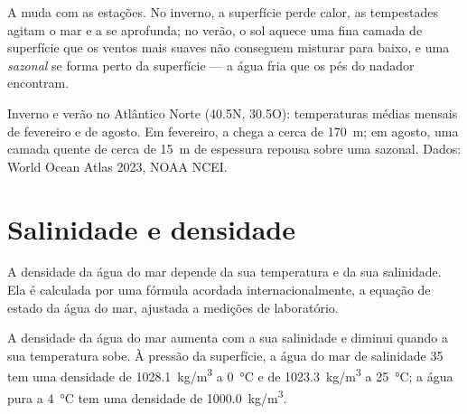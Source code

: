 A  muda com as estações. No inverno, a superfície perde
calor, as tempestades agitam o mar e a  se aprofunda; no
verão, o sol aquece uma fina camada de superfície que os ventos mais suaves
não conseguem misturar para baixo, e uma \emph{ sazonal} se forma
perto da superfície --- a água fria que os pés do nadador encontram.

\begin{omfigure}

{\small Inverno e verão no Atlântico Norte (40.5\textdegree N,
30.5\textdegree O): temperaturas médias mensais de fevereiro e de agosto.
Em fevereiro, a  chega a cerca de \qty{170}{m}; em agosto,
uma camada quente de cerca de \qty{15}{m} de espessura repousa sobre uma
 sazonal. Dados: World Ocean Atlas 2023, NOAA NCEI.}
\end{omfigure}

\section{Salinidade e densidade}

A densidade da água do mar depende da sua temperatura e da sua salinidade.
Ela é calculada por uma fórmula acordada internacionalmente, a equação de
estado da água do mar, ajustada a medições de laboratório.

\begin{proposition}\label{prop:g10:layered-ocean:density}
A densidade da água do mar aumenta com a sua salinidade e diminui quando a
sua temperatura sobe. À pressão da superfície, a água do mar de salinidade
35 tem uma densidade de \qty{1028.1}{kg/m^3} a \qty{0}{\degreeCelsius} e de
\qty{1023.3}{kg/m^3} a \qty{25}{\degreeCelsius}; a água pura a
\qty{4}{\degreeCelsius} tem uma densidade de \qty{1000.0}{kg/m^3}.
\end{proposition}

